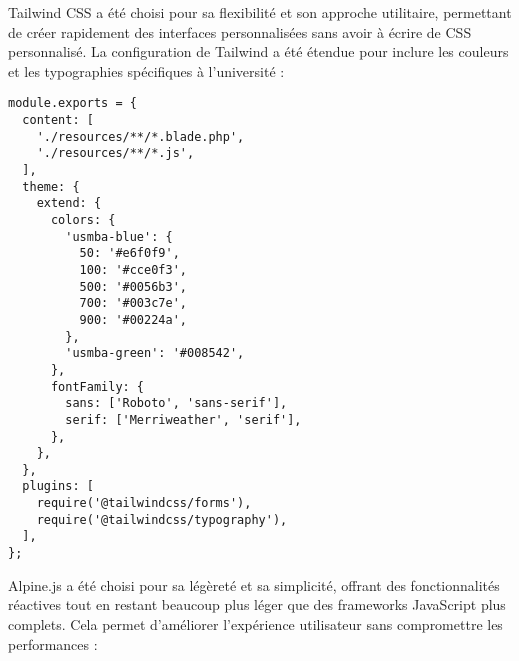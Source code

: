 \documentclass[french,12pt]{report} %
\begin{document}
Tailwind CSS a été choisi pour sa flexibilité et son approche utilitaire, permettant de créer rapidement des interfaces personnalisées sans avoir à écrire de CSS personnalisé. La configuration de Tailwind a été étendue pour inclure les couleurs et les typographies spécifiques à l'université :

\begin{lstlisting}[style=javascriptstyle,caption={Configuration de Tailwind CSS (tailwind.config.js)}]
module.exports = {
  content: [
    './resources/**/*.blade.php',
    './resources/**/*.js',
  ],
  theme: {
    extend: {
      colors: {
        'usmba-blue': {
          50: '#e6f0f9',
          100: '#cce0f3',
          500: '#0056b3',
          700: '#003c7e',
          900: '#00224a',
        },
        'usmba-green': '#008542',
      },
      fontFamily: {
        sans: ['Roboto', 'sans-serif'],
        serif: ['Merriweather', 'serif'],
      },
    },
  },
  plugins: [
    require('@tailwindcss/forms'),
    require('@tailwindcss/typography'),
  ],
};
\end{lstlisting}

Alpine.js a été choisi pour sa légèreté et sa simplicité, offrant des fonctionnalités réactives tout en restant beaucoup plus léger que des frameworks JavaScript plus complets. Cela permet d'améliorer l'expérience utilisateur sans compromettre les performances :
\end{document}
